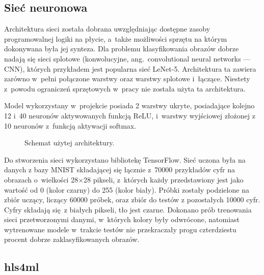 \documentclass[12pt, oneside, a4paper]{article}
\begin{document}
\subsection{Sieć neuronowa}
Architektura sieci została dobrana uwzględniając dostępne zasoby programowalnej
logiki na płycie, a~także możliwości sprzętu na którym dokonywana była jej
synteza. Dla problemu klasyfikowania obrazów dobrze nadają się sieci
splotowe (konwolucyjne, ang.\ convolutional neural networks --- CNN), 
 których przykładem jest popularna sieć \mbox{LeNet-5}.
Architektura ta zawiera zarówno w~pełni połączone warstwy
oraz warstwy splotowe i~łączące.
Niestety z~powodu ograniczeń sprzętowych w~pracy nie została użyta ta
architektura.

Model wykorzystany w~projekcie posiada 2 warstwy ukryte, posiadające kolejno
12 i~40 neuronów aktywowanych funkcją ReLU, i~warstwy wyjściowej złożonej
z 10 neuronów z~funkcją aktywacji softmax.
\begin{figure}[h]
\hspace{2cm}
  \centering
  
  \caption{Schemat użytej architektury.
  }\label{fig:nn-scheme}
\end{figure}

Do stworzenia sieci wykorzystano
bibliotekę TensorFlow. Sieć uczona była na danych
z bazy MNIST składającej się łącznie z~70000 przykładów
cyfr na obrazach o~wielkości 28\(\times \)28 pikseli, z~których każdy
przedstawiony jest jako wartość od 0 (kolor czarny) do 255 (kolor biały).
Próbki zostały
podzielone na zbiór uczący, liczący 60000 próbek, oraz zbiór do testów
z pozostałych 10000 cyfr. Cyfry składają się z białych pikseli, tło jest czarne.
Dokonano prób trenowania sieci przetworzonymi danymi, w~których kolory były
odwrócone, natomiast wytrenowane modele w~trakcie testów nie przekraczały
progu czterdziestu procent dobrze zaklasyfikowanych obrazów.

\subsection{hls4ml}
\end{document}
